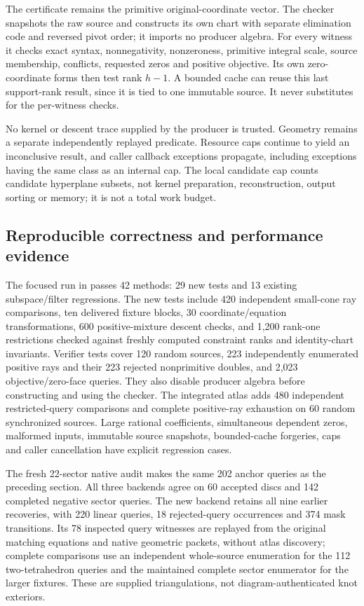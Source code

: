 The certificate remains the primitive original-coordinate vector.  The
checker snapshots the raw source and constructs its own chart with separate
elimination code and reversed pivot order; it imports no producer algebra.
For every witness it checks exact syntax, nonnegativity, nonzeroness,
primitive integral scale, source membership, conflicts, requested zeros and
positive objective.  Its own zero-coordinate forms then test rank $h-1$.
A bounded cache can reuse this last support-rank result, since it is tied to
one immutable source.  It never substitutes for the per-witness checks.

No kernel or descent trace supplied by the producer is trusted.  Geometry
remains a separate independently replayed predicate.  Resource caps continue
to yield an inconclusive result, and caller callback exceptions propagate,
including exceptions having the same class as an internal cap.  The local
candidate cap counts candidate hyperplane subsets, not kernel preparation,
reconstruction, output sorting or memory; it is not a total work budget.

\subsection{Reproducible correctness and performance evidence}

The focused run in  passes 42 methods:
29 new tests and 13 existing subspace/filter regressions.  The new tests
include 420 independent small-cone ray comparisons, ten delivered fixture
blocks, 30 coordinate/equation transformations, 600 positive-mixture descent
checks, and 1,200 rank-one restrictions checked against freshly computed
constraint ranks and identity-chart invariants.  Verifier tests cover
120 random sources, 223 independently enumerated positive rays and their
223 rejected nonprimitive doubles, and 2,023 objective/zero-face queries.
They also disable producer algebra before constructing and using the checker.
The integrated atlas adds 480 independent restricted-query comparisons and
complete positive-ray exhaustion on 60 random synchronized sources.
Large rational coefficients, simultaneous dependent zeros, malformed inputs,
immutable source snapshots, bounded-cache forgeries, caps and caller
cancellation have explicit regression cases.

The fresh 22-sector native audit makes the same 202 anchor queries as the
preceding section.  All three backends agree on 60 accepted discs and 142
completed negative sector queries.  The new backend retains all nine earlier
recoveries, with 220 linear queries, 18 rejected-query occurrences and 374
mask transitions.  Its 78 inspected query witnesses are replayed from the
original matching equations and native geometric packets, without atlas
discovery; complete comparisons use an independent whole-source enumeration
for the 112 two-tetrahedron queries and the maintained complete sector
enumerator for the larger fixtures.  These are supplied triangulations,
not diagram-authenticated knot exteriors.


